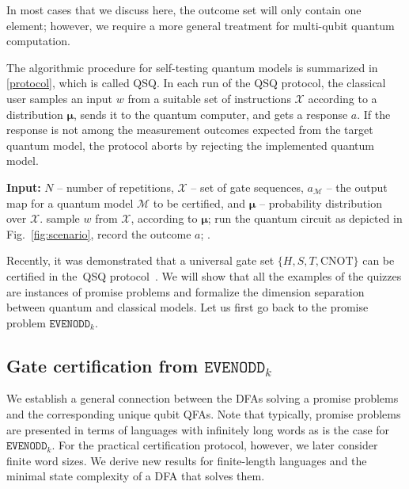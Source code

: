 \documentclass[../main.tex]{subfiles}
\begin{document}
In most cases that we discuss here, the outcome set will only contain one element; however, we require a more general treatment for multi-qubit quantum computation. 

The algorithmic procedure for self-testing quantum models is summarized in \cref{protocol}, which is called \acf{QSQ}.
In each run of the \ac{QSQ} protocol, the classical user samples an input $w$ from a suitable set of instructions $\mathcal{X}$ according to a distribution $\bm{\mu}$, sends it to the quantum computer, and gets a response $a$. 
If the response is not among the measurement outcomes expected from the target quantum model, the protocol aborts by rejecting the implemented quantum model.

{
\begin{algorithm}[H]
\caption{Quantum system quizzing (QSQ)}\label{protocol}
\begin{algorithmic}
\STATE \textbf{Input:} $N$ -- number of repetitions, $\mathcal{X}$ -- set of gate sequences, $a_\mathcal{M}$ -- the output map for a quantum model $\mathcal{M}$ to be certified, and $\bm{\mu}$ --  probability distribution over $\mathcal{X}$.
\STATE sample $w$ from $\mathcal{X}$, according to $\bm{\mu}$;
\STATE run the quantum circuit as depicted in Fig.~\ref{fig:scenario}, record the outcome $a$;
\ENDIF
\ENDFOR
\STATE \RETURN {}.
\end{algorithmic}
\end{algorithm}
}

Recently, it was demonstrated that a universal gate set $\{H,S,T,\mathrm{CNOT}\}$ can be certified in the~\ac{QSQ} protocol~\cite{noller2024classical,noller2024self}. We will show that all the examples of the quizzes are instances of promise problems and formalize the dimension separation between quantum and classical models. Let us first go back to the promise problem $\mathtt{EVENODD}_k$.


\subsection{Gate certification from $\mathtt{EVENODD}_k$}

 We establish a general connection between the DFAs solving a promise problems and the corresponding unique qubit QFAs. Note that typically, promise problems are presented in terms of languages with infinitely long words as is the case for $\mathtt{EVENODD}_k$. For the practical certification protocol, however,  we later consider finite word sizes. We derive new results for finite-length languages and the minimal state complexity of a DFA that solves them. 
\end{document}
